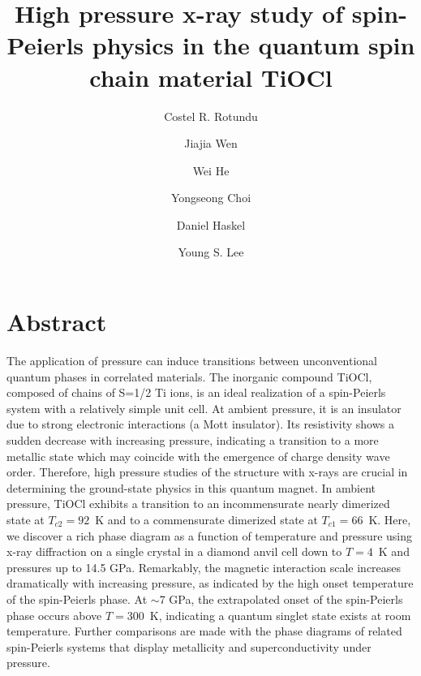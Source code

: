 \documentclass[preprint,superscriptaddress,amsmath,amssymb,aps,prl]{revtex4-1}
\begin{document}
\title{High pressure x-ray study of spin-Peierls physics in the quantum spin chain material TiOCl}

\author{Costel R. Rotundu}
\author{Jiajia Wen}
\author{Wei He}
\author{Yongseong Choi}
\author{Daniel Haskel}
\author{Young S. Lee}

\maketitle
\section*{Abstract}

The application of pressure can induce transitions between unconventional quantum phases in correlated materials. The inorganic compound TiOCl, composed of chains of S=1/2 Ti ions, is an ideal realization of a spin-Peierls system with a relatively simple unit cell. At ambient pressure, it is an insulator due to strong electronic interactions (a Mott insulator). Its resistivity shows a sudden decrease with increasing pressure, indicating a transition to a more metallic state which may coincide with the emergence of charge density wave order. Therefore, high pressure studies of the structure with x-rays are crucial in determining the ground-state physics in this quantum magnet. In ambient pressure, TiOCl exhibits a transition to an incommensurate nearly dimerized state at $T_{c2}=92$~K and to a commensurate dimerized state at $T_{c1}=66$~K. Here, we discover a rich phase diagram as a function of temperature and pressure using x-ray diffraction on a single crystal in a diamond anvil cell down to $T=4$~K  and pressures up to 14.5 GPa. Remarkably, the magnetic interaction scale increases dramatically with increasing pressure, as indicated by the high onset temperature of the spin-Peierls phase. At $\sim$7 GPa, the extrapolated onset of the spin-Peierls phase occurs above $T=300$~K, indicating a quantum singlet state exists at room temperature. Further comparisons are made with the phase diagrams of related spin-Peierls systems that display metallicity and superconductivity under pressure.
\end{document}
